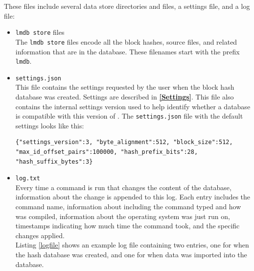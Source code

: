 \documentclass[11pt,fleqn]{article} %
\begin{document}
These files include several data store directories and files, a settings file, and a log file:

\begin{itemize}
\item \texttt{lmdb store} files \\
The \texttt{lmdb store} files encode all the block hashes, source files, and related information that are in the database. These filenames start with the prefix \verb+lmdb+.

\item \texttt{settings.json} \\
This file contains the settings requested by the user when the block hash database was created. Settings are described in \textbf{\autoref{Settings}}. This file also contains the internal \hdb settings version used to help \hdb identify whether a database is compatible with this version of \hdb. The \texttt{settings.json} file with the default settings looks like this:

\begingroup
\footnotesize
\begin{Verbatim}[fontfamily=courier]
{"settings_version":3, "byte_alignment":512, "block_size":512,
"max_id_offset_pairs":100000, "hash_prefix_bits":28,
"hash_suffix_bytes":3}
\end{Verbatim}
\endgroup

\item \texttt{log.txt} \\
Every time a command is run that changes the content of the database, information about the change is appended to this log.  Each entry includes the command name, information about \hdb including the command typed and how \hdb was compiled, information about the operating system \hdb was just run on, timestamps indicating how much time the command took, and the specific \hdb changes applied.\\

Listing \ref{logfile} shows an example log file containing two entries, one for when the hash database was created, and one for when data was imported into the database.


\end{itemize}
\end{document}
